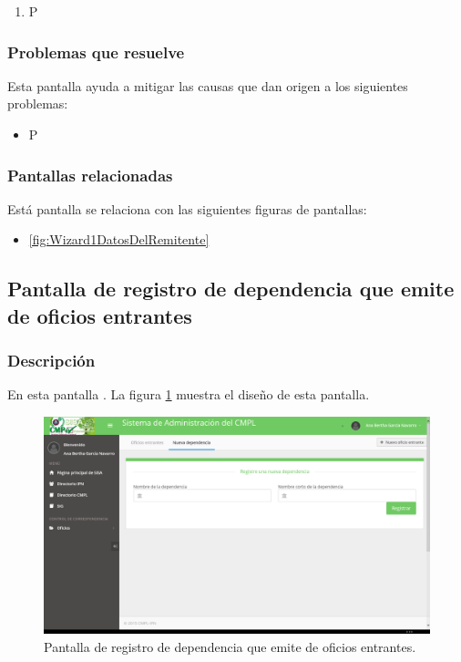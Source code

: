 	\begin{enumerate}
		\item P
	\end{enumerate}

\subsubsection{Problemas que resuelve}
Esta pantalla ayuda a mitigar las causas que dan origen a los siguientes problemas:

	\begin{itemize}
		\item P
	\end{itemize}

\subsubsection{Pantallas relacionadas}
Está pantalla se relaciona con las siguientes figuras de pantallas:
	\begin{itemize}
		\item \ref{fig:Wizard1DatosDelRemitente}
	\end{itemize}

\subsection{Pantalla de registro de dependencia que emite de oficios entrantes}
\subsubsection{Descripción}
	En esta pantalla . La figura \ref{fig:NuevaDependencia} muestra el diseño de esta pantalla.		
		
	\begin{figure}[htbp!]
		\centering
			\includegraphics[width=1\textwidth]{Pantallas/NuevaDependencia.png}
		\caption{Pantalla de registro de dependencia que emite de oficios entrantes.}
		\label{fig:NuevaDependencia}
	\end{figure}

